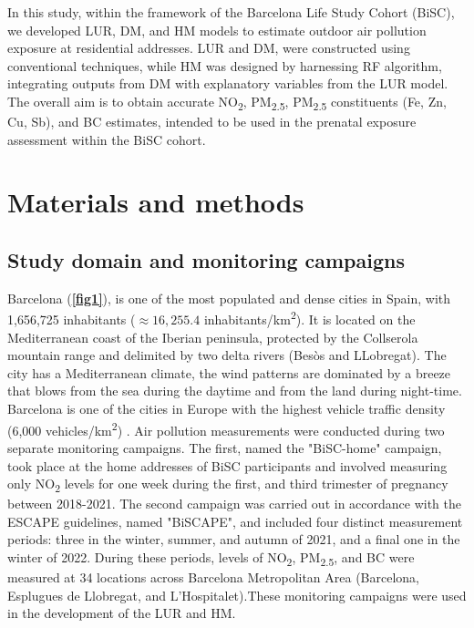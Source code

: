 \documentclass{article}
\begin{document}
In this study, within the framework of the Barcelona Life Study Cohort (BiSC), we developed LUR, DM, and HM models to estimate outdoor air pollution exposure at residential addresses. LUR and DM, were constructed using conventional techniques, while HM was designed by harnessing RF algorithm, integrating outputs from DM with explanatory variables from the LUR model. The overall aim is to obtain accurate NO\textsubscript{2}, PM\textsubscript{2.5}, PM\textsubscript{2.5} constituents (Fe, Zn, Cu, Sb), and BC estimates, intended to be used in the prenatal exposure assessment within the BiSC cohort. 

\section{Materials and methods}

\subsection{Study domain and monitoring campaigns}

Barcelona (\textbf{\cref{fig1}}), is one of the most populated and dense cities in Spain, with 1,656,725 inhabitants ($\approx16,255.4$ inhabitants/km\textsuperscript{2}). It is located on the Mediterranean coast of the Iberian peninsula, protected by the Collserola mountain range and delimited by two delta rivers (Besòs and LLobregat). The city has a Mediterranean climate, the wind patterns are dominated by a breeze that blows from the sea during the daytime and from the land during night-time. Barcelona is one of the cities in Europe with the highest vehicle traffic density (6,000 vehicles/km\textsuperscript{2}) \cite{casallas2018}. Air pollution measurements were conducted during two separate monitoring campaigns. The first, named the "BiSC-home" campaign, took place at the home addresses of BiSC participants and involved measuring only NO\textsubscript{2} levels for one week during the first, and third trimester of pregnancy between 2018-2021. The second campaign was carried out in accordance with the ESCAPE guidelines, named "BiSCAPE", and included four distinct measurement periods: three in the winter, summer, and autumn of 2021, and a final one in the winter of 2022. During these periods, levels of NO\textsubscript{2}, PM\textsubscript{2.5}, and BC were measured at 34 locations across Barcelona Metropolitan Area (Barcelona, Esplugues de Llobregat, and L'Hospitalet).These monitoring campaigns were used in the development of the LUR and HM.
\end{document}
